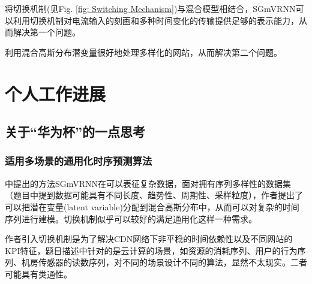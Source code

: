 \documentclass[letterpaper,12pt]{article}
\begin{document}
	将切换机制(见Fig. \ref{fig: Switching Mechanism})与混合模型相结合，SGmVRNN可以利用切换机制对电流输入的刻画和多种时间变化的传输提供足够的表示能力，从而解决第一个问题。
	
	利用混合高斯分布潜变量很好地处理多样化的网站，从而解决第二个问题。
	
	\section{个人工作进展}
	
	\subsection{关于“华为杯”的一点思考}
	
	\subsubsection{适用多场景的通用化时序预测算法}
	
	\cite{dai2022switching}中提出的方法SGmVRNN在可以表征复杂数据，面对拥有序列多样性的数据集（题目中提到数据可能具有不同长度、趋势性、周期性、采样粒度），作者提出了可以把潜在变量(latent variable)分配到混合高斯分布中，从而可以对复杂的时间序列进行建模。切换机制似乎可以较好的满足通用化这样一种需求。
	
	作者引入切换机制是为了解决CDN网络下非平稳的时间依赖性以及不同网站的KPI特征，题目描述中针对的是云计算的场景，如资源的消耗序列、用户的行为序列、机房传感器的读数序列，对不同的场景设计不同的算法，显然不太现实。二者可能具有类通性。
	
\end{document}
